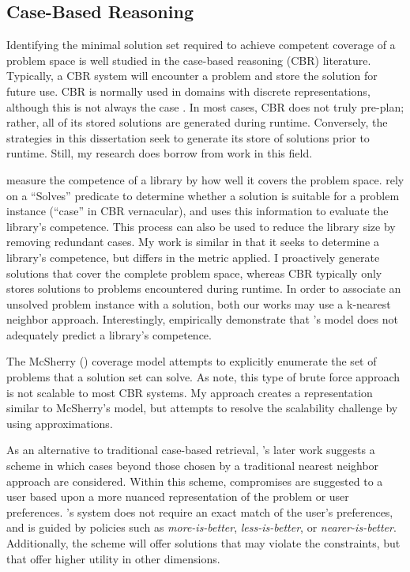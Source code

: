 
\subsection{Case-Based Reasoning}
Identifying the minimal solution set required to achieve competent coverage of a problem space is well studied in the case-based reasoning (CBR) literature.  Typically, a CBR system will encounter a problem and store the solution for future use.  CBR is normally used in domains with discrete representations, although this is not always the case \citep{ram97continuous}.  In most cases, CBR does not truly pre-plan;  rather, all of its stored solutions are generated during runtime.  Conversely, the strategies in this dissertation seek to generate its store of solutions prior to runtime.  Still, my research does borrow from work in this field.

\citet{smyth01competence} measure the competence of a library by how well it covers the problem space.   \citeauthor{smyth01competence} rely on a ``Solves'' predicate to determine whether a solution is suitable for a problem instance (``case'' in CBR vernacular), and uses this information to evaluate the library's competence.  This process can also be used to reduce the library size by removing redundant cases.  My work is similar in that it seeks to determine a library's competence, but differs in the metric applied.  I proactively generate solutions that cover the complete problem space, whereas CBR typically only stores solutions to problems encountered during runtime.  In order to associate an unsolved problem instance with a solution, both our works may use a k-nearest neighbor approach.    Interestingly, \citet{massie03what} empirically demonstrate that \citeauthor{smyth01competence}'s model does not adequately predict a library's competence.

The McSherry (\citeyear{mcsherry2000case}) coverage model attempts to explicitly enumerate the set of problems that a solution set can solve.  As \citeauthor{smyth01competence} note, this type of brute force approach is not scalable to most CBR systems.  My approach creates a representation similar to McSherry's model, but attempts to resolve the scalability challenge by using approximations.

As an alternative to traditional case-based retrieval, \citeauthor{mcsherry03similarity}'s later work \citep{mcsherry03similarity} suggests a scheme in which cases beyond those chosen by a traditional nearest neighbor approach are considered.  Within this scheme, compromises are suggested to a user based upon a more nuanced representation of the problem or user preferences.  \citeauthor{mcsherry03similarity}'s system does not require an  exact match of the user's preferences, and is guided by policies such as {\em more-is-better}, {\em less-is-better}, or {\em nearer-is-better}.  Additionally, the scheme will offer solutions that may violate the constraints, but that offer higher utility in other dimensions.  


